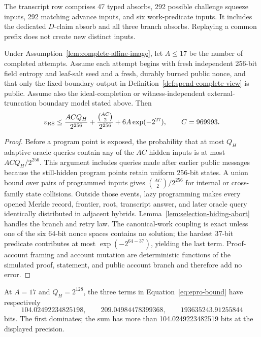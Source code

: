 The transcript row comprises 47 typed absorbs, 292 possible challenge
squeeze inputs, 292 matching advance inputs, and six work-predicate inputs.
It includes the dedicated \(D\)-claim absorb and all three branch absorbs.
Replaying a common prefix does not create new distinct inputs.

\begin{lemma}
\label{lem:epro-complete-view}
Under Assumption~\ref{lem:complete-affine-image}, let \(A\le17\) be the
number of completed attempts.  Assume each attempt begins with
fresh independent 256-bit field entropy and leaf-salt seed and a fresh,
durably burned public nonce, and that only the fixed-boundary output in
Definition~\ref{def:spend-complete-view} is public.  Assume also the
ideal-completion or witness-independent external-truncation boundary model
stated above.  Then
\begin{equation}
 \varepsilon_{\rm RS}
 \le
 \frac{ACQ_H}{2^{256}}
 +\frac{\binom{AC}{2}}{2^{256}}
 +6A\exp(-2^{27}),
 \qquad C=969993.
 \label{eq:epro-bound}
\end{equation}
\end{lemma}

\begin{proof}
Before a program point is exposed, the probability that at most \(Q_H\)
adaptive oracle queries contain any of the \(AC\) hidden inputs is at most
\(ACQ_H/2^{256}\).  This argument includes queries made after earlier public
messages because the still-hidden program points retain uniform 256-bit
states.  A union bound over pairs of programmed inputs gives
\(\binom{AC}{2}/2^{256}\) for internal or cross-family state collisions.
Outside those events, lazy programming makes every opened Merkle record,
frontier, root, transcript answer, and later oracle query identically
distributed in adjacent hybrids.  Lemma~\ref{lem:selection-hiding-abort}
handles the branch and retry law.  The canonical-work coupling is exact
unless one of the six 64-bit nonce spaces contains no solution; the hardest
37-bit predicate contributes at most \(\exp(-2^{64-37})\), yielding the last
term.  Proof-account framing and account mutation are deterministic functions
of the simulated proof, statement, and public account branch and therefore
add no error.
\end{proof}

At \(A=17\) and \(Q_H=2^{128}\), the three terms in
Equation~\eqref{eq:epro-bound} have respectively
\[
 104.02492234825198,\qquad
 209.04984478399368,\qquad
 193635243.91255844
\]
bits.  The first dominates; the sum has more than
104.0249223482519 bits at the displayed precision.

